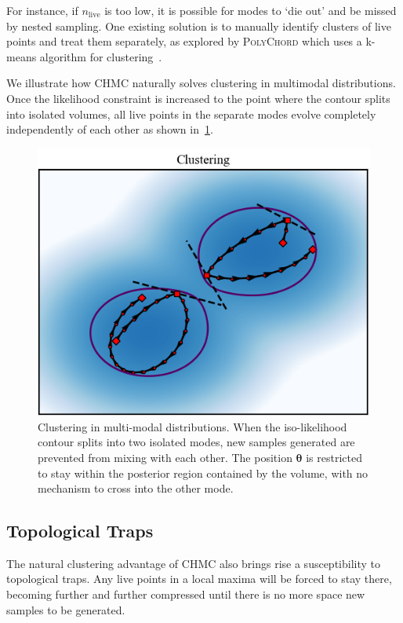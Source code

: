 \documentclass[11pt]{article}
\begin{document}
    For instance, if $n_{\text{live}}$ is too low, it is possible for modes to `die out' and be missed by nested sampling.
    One existing solution is to manually identify clusters of live points and treat them separately,
    as explored by \textsc{PolyChord} which uses a k-means algorithm for clustering~\cite{Handley_polychord}.

    We illustrate how CHMC naturally solves clustering in multimodal distributions.
    Once the likelihood constraint is increased to the point where the contour splits into isolated volumes,
    all live points in the separate modes evolve completely independently of each other as shown in~\cref{fig:clustering}.

    \begin{figure}[h!]
        \center
        \includegraphics[width=\linewidth]{../figures/Clustering}
        \caption{
        Clustering in multi-modal distributions. When the iso-likelihood contour splits into
        two isolated modes, new samples generated are prevented from mixing with each other.
        The position $\mathbf{\theta}$ is restricted to stay within the posterior region contained by the volume,
        with no mechanism to cross into the other mode.
        }\label{fig:clustering}
    \end{figure}

\subsection{Topological Traps}\label{subsec:topological_trap}
    The natural clustering advantage of CHMC also brings rise a susceptibility to topological traps.
    Any live points in a local maxima will be forced to stay there, becoming further and further compressed until there
    is no more space new samples to be generated.
\end{document}
